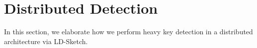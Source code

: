 \section{Distributed Detection}
\label{sec:distributed}

In this section, we elaborate how we perform heavy key detection in a
distributed architecture via LD-Sketch. 

%
%
%
%
%

